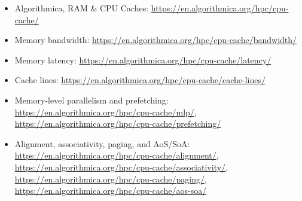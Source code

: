 \documentclass[11pt]{article}
\begin{document}
\begin{itemize}
  \item Algorithmica, RAM \& CPU Caches:
        \url{https://en.algorithmica.org/hpc/cpu-cache/}
  \item Memory bandwidth:
        \url{https://en.algorithmica.org/hpc/cpu-cache/bandwidth/}
  \item Memory latency:
        \url{https://en.algorithmica.org/hpc/cpu-cache/latency/}
  \item Cache lines:
        \url{https://en.algorithmica.org/hpc/cpu-cache/cache-lines/}
  \item Memory-level parallelism and prefetching:
        \url{https://en.algorithmica.org/hpc/cpu-cache/mlp/},
        \url{https://en.algorithmica.org/hpc/cpu-cache/prefetching/}
  \item Alignment, associativity, paging, and AoS/SoA:
        \url{https://en.algorithmica.org/hpc/cpu-cache/alignment/},
        \url{https://en.algorithmica.org/hpc/cpu-cache/associativity/},
        \url{https://en.algorithmica.org/hpc/cpu-cache/paging/},
        \url{https://en.algorithmica.org/hpc/cpu-cache/aos-soa/}
\end{itemize}
\end{document}
